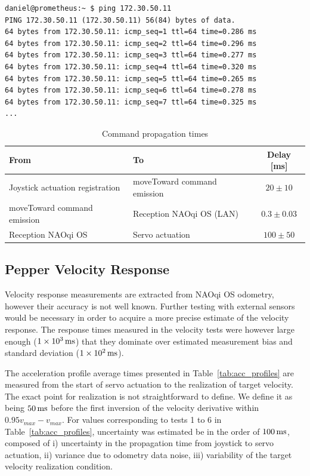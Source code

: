 \documentclass[11pt,a4paper]{article}
\begin{document}
\begin{lstlisting}[frame=single, caption={Example output for network latency measurements}]
daniel@prometheus:~ $ ping 172.30.50.11
PING 172.30.50.11 (172.30.50.11) 56(84) bytes of data.
64 bytes from 172.30.50.11: icmp_seq=1 ttl=64 time=0.286 ms
64 bytes from 172.30.50.11: icmp_seq=2 ttl=64 time=0.296 ms
64 bytes from 172.30.50.11: icmp_seq=3 ttl=64 time=0.277 ms
64 bytes from 172.30.50.11: icmp_seq=4 ttl=64 time=0.320 ms
64 bytes from 172.30.50.11: icmp_seq=5 ttl=64 time=0.265 ms
64 bytes from 172.30.50.11: icmp_seq=6 ttl=64 time=0.278 ms
64 bytes from 172.30.50.11: icmp_seq=7 ttl=64 time=0.325 ms
...
\end{lstlisting}

\begin{table}[h]
  \centering
  \caption{Command propagation times}
  \label{tab:command_time}
  \begin{tabular}{ l  l  c }
  \toprule
   From & To & Delay [ms] \\\midrule
   Joystick actuation registration & moveToward command emission &  $20 \pm10$ \\
   moveToward command emission & Reception NAOqi OS (LAN) &  $0.3 \pm0.03$\\
   Reception NAOqi OS & Servo actuation & $100 \pm50$ \\\bottomrule
  \end{tabular}
\end{table}

\subsection{Pepper Velocity Response}

Velocity response measurements are extracted from NAOqi OS odometry, however their accuracy is not well known. Further testing with external sensors would be necessary in order to acquire a more precise estimate of the velocity response. The response times measured in the velocity tests were however large enough ($\unit[1\times10^3]{ms}$) that they dominate over estimated measurement bias and standard deviation ($\unit[1\times10^2]{ms}$).

The acceleration profile average times presented in Table~\ref{tab:acc_profiles} are measured from the start of servo actuation to the realization of target velocity. The exact point for realization is not straightforward to define. We define it as being $\unit[50]{ms}$ before the first inversion of the velocity derivative within $0.95v_{max} - v_{max}$.
For values corresponding to tests 1 to 6 in Table~\ref{tab:acc_profiles}, uncertainty was estimated be in the order of $\unit[100]{ms}$, composed of i) uncertainty in the propagation time from joystick to servo actuation, ii) variance due to odometry data noise, iii) variability of the target velocity realization condition.
\end{document}
